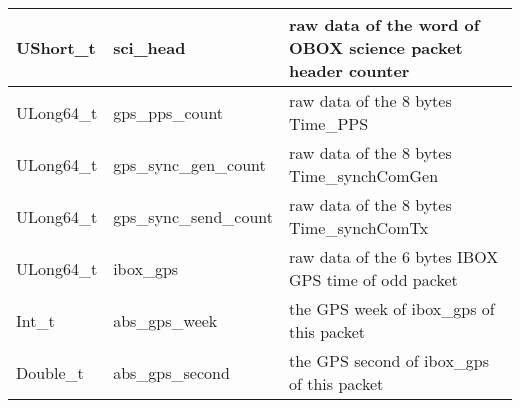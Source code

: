 \documentclass[a4paper, 12pt, onecolumn]{article}
\begin{document}
\begin{center}
\begin{supertabular}{| p{18mm} | p{38mm} | p{66mm} |}
    UShort\_t   & sci\_head                & raw data of the word of OBOX science packet header counter \\\hline
    ULong64\_t  & gps\_pps\_count          & raw data of the 8 bytes Time\_PPS \\\hline
    ULong64\_t  & gps\_sync\_gen\_count    & raw data of the 8 bytes Time\_synchComGen \\\hline
    ULong64\_t  & gps\_sync\_send\_count   & raw data of the 8 bytes Time\_synchComTx \\\hline
    ULong64\_t  & ibox\_gps                & raw data of the 6 bytes IBOX GPS time of odd packet \\\hline
    Int\_t      & abs\_gps\_week           & the GPS week of ibox\_gps of this packet \\\hline
    Double\_t   & abs\_gps\_second         & the GPS second of ibox\_gps of this packet \\ 
  \end{supertabular}
\end{center}

\newpage
\end{document}
